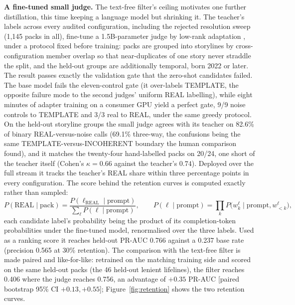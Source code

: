 \documentclass[a4paper,12pt]{report}
\begin{document}
\textbf{A fine-tuned small judge.} The text-free filter's ceiling
motivates one further distillation, this time keeping a language model
but shrinking it. The teacher's labels across every audited
configuration, including the rejected resolution sweep (1{,}145 packs in
all), fine-tune a 1.5B-parameter judge by low-rank adaptation
\citep{Hu2022LoRA}, under a protocol fixed before training: packs are
grouped into storylines by cross-configuration member overlap so that
near-duplicates of one story never straddle the split, and the held-out
groups are additionally temporal, born 2022 or later. The result passes
exactly the validation gate that the zero-shot candidates failed. The base model fails
the eleven-control gate (it over-labels TEMPLATE, the opposite failure
mode to the second judges' uniform REAL labelling), while eight minutes of adapter
training on a consumer GPU yield a perfect gate, 9/9 noise controls to
TEMPLATE and 3/3 real to REAL, under the same greedy protocol. On the
held-out storyline groups the small judge agrees with its teacher on
82.6\% of binary REAL-versus-noise calls (69.1\% three-way, the
confusions being the same TEMPLATE-versus-INCOHERENT boundary the human
comparison found), and it matches the twenty-four hand-labelled packs
on 20/24, one short of the teacher itself (Cohen's $\kappa = 0.66$
against the teacher's $0.74$). Deployed over the full
stream it tracks the teacher's REAL share within three percentage
points in every configuration. The score behind the retention curves is
computed exactly rather than sampled:
\begin{equation}
P(\mathrm{REAL} \mid \mathrm{pack}) =
\frac{P(\ell_{\mathrm{REAL}} \mid \mathrm{prompt})}
{\sum_{\ell} P(\ell \mid \mathrm{prompt})}, \qquad
P(\ell \mid \mathrm{prompt}) = \prod_{k} P\bigl(w_k^{\ell} \mid
\mathrm{prompt}, w_{<k}^{\ell}\bigr),
\label{eq:judgescore}
\end{equation}
each candidate label's probability being the product of its
completion-token probabilities under the fine-tuned model, renormalised
over the three labels. Used as a ranking score it reaches held-out PR-AUC
0.766 against a 0.237 base rate (precision 0.565 at 30\% retention). The comparison with the text-free
filter is made paired and like-for-like: retrained on the matching
training side and scored on the same held-out packs (the 46 held-out
lenient lifelines), the filter reaches
0.406 where the judge reaches 0.756, an advantage of $+0.35$ PR-AUC
[paired bootstrap 95\% CI $+0.13, +0.55$];
Figure~\ref{fig:retention} shows the two retention curves.
\end{document}
